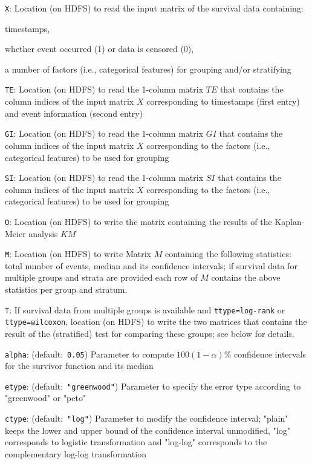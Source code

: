 \smallskip
{}
\begin{Description}
\item[{\tt X}:]
Location (on HDFS) to read the input matrix of the survival data containing: 
\begin{Itemize}
	\item timestamps,
	\item whether event occurred (1) or data is censored (0),
	\item a number of factors (i.e., categorical features) for grouping and/or stratifying
\end{Itemize}
\item[{\tt TE}:]
Location (on HDFS) to read the 1-column matrix $TE$ that contains the column indices of the input matrix $X$ corresponding to timestamps (first entry) and event information (second entry) 
\item[{\tt GI}:]
Location (on HDFS) to read the 1-column matrix $GI$ that contains the column indices of the input matrix $X$ corresponding to the factors (i.e., categorical features) to be used for grouping
\item[{\tt SI}:]
Location (on HDFS) to read the 1-column matrix $SI$ that contains the column indices of the input matrix $X$ corresponding to the factors (i.e., categorical features) to be used for grouping
\item[{\tt O}:]
Location (on HDFS) to write the matrix containing the results of the Kaplan-Meier analysis $KM$
\item[{\tt M}:]
Location (on HDFS) to write Matrix $M$ containing the following statistics: total number of events, median and its confidence intervals; if survival data for multiple groups and strata are provided each row of $M$ contains the above statistics per group and stratum.
\item[{\tt T}:]
If survival data from multiple groups is available and {\tt ttype=log-rank} or {\tt ttype=wilcoxon}, location (on HDFS) to write the two matrices that contains the result of the (stratified) test for comparing these groups; see below for details.
\item[{\tt alpha}:](default:\mbox{ }{\tt 0.05})
Parameter to compute $100(1-\alpha)\%$ confidence intervals for the survivor function and its median 
\item[{\tt etype}:](default:\mbox{ }{\tt "greenwood"})
Parameter to specify the error type according to "greenwood" or "peto"
\item[{\tt ctype}:](default:\mbox{ }{\tt "log"})
Parameter to modify the confidence interval; "plain" keeps the lower and upper bound of the confidence interval unmodified,	"log" corresponds to logistic transformation and "log-log" corresponds to the complementary log-log transformation

\end{Description}
